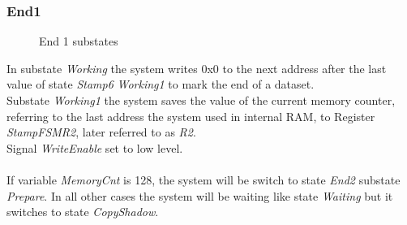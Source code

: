 \subsubsection{End1}
\begin{figure}[htb] 
\begin{center}
\end{center}
\caption{End 1 substates}
\end{figure}
\noindent
In substate \textit{Working} the system writes 0x0 to the next address after the last value of state \textit{Stamp6} \textit{Working1} to mark the end of a dataset. \\
Substate \textit{Working1} the system saves the value of the current memory counter, referring to the last address the system used in internal RAM, to Register \textit{StampFSMR2}, later referred to as \textit{R2}. \\
Signal \textit{WriteEnable} set to low level. \\\\ 
If variable \textit{MemoryCnt} is 128, the system will be switch to state \textit{End2} substate \textit{Prepare}. In all other cases the system will be waiting like state \textit{Waiting} but it switches to state \textit{CopyShadow}. 
